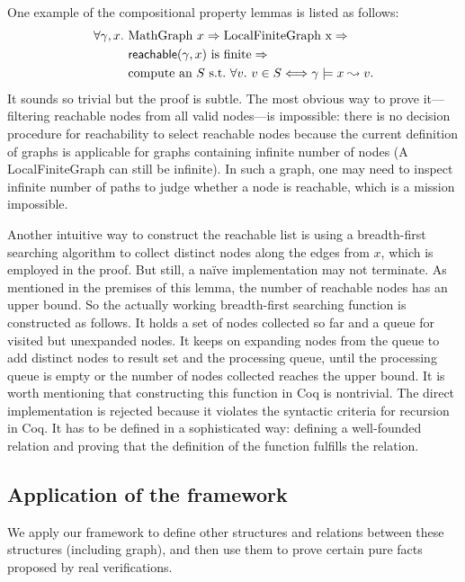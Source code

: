 One example of the compositional property lemmas is listed as follows:
\[
\begin{split}
\forall \gamma, x.~&\text{MathGraph }x => \text{LocalFiniteGraph x} =>\\
        & \mathsf{reachable}(\gamma, x)\text{ is finite} => \\
        & \text{compute an }S \text{ s.t.\ } \forall v.~v \in S <=>
        \gamma \models x \leadsto v.
\end{split}
\]
It sounds so trivial but the proof is subtle. The most obvious way to
prove it---filtering reachable nodes from all valid nodes---is
impossible: there is no decision procedure for reachability to select
reachable nodes because the current definition of graphs is applicable
for graphs containing infinite number of nodes (A LocalFiniteGraph can
still be infinite). In such a graph, one may need to inspect infinite
number of paths to judge whether a node is reachable, which is a
mission impossible.

Another intuitive way to construct the reachable list is using a
breadth-first searching algorithm to collect distinct nodes along the
edges from $x$, which is employed in the proof. But still, a na\"ive
implementation may not terminate. As mentioned in the premises of this
lemma, the number of reachable nodes has an upper bound. So the
actually working breadth-first searching function is constructed as
follows. It holds a set of nodes collected so far and a queue for
visited but unexpanded nodes. It keeps on expanding nodes from the
queue to add distinct nodes to result set and the processing queue,
until the processing queue is empty or the number of nodes collected
reaches the upper bound. It is worth mentioning that constructing this
function in Coq is nontrivial. The direct implementation is rejected
because it violates the syntactic criteria for recursion in Coq. It
has to be defined in a sophisticated way: defining a well-founded
relation and proving that the definition of the function fulfills the
relation.

\subsection{Application of the framework}

We apply our framework to define other structures and relations
between these structures (including graph), and then use them to prove
certain pure facts proposed by real verifications.

